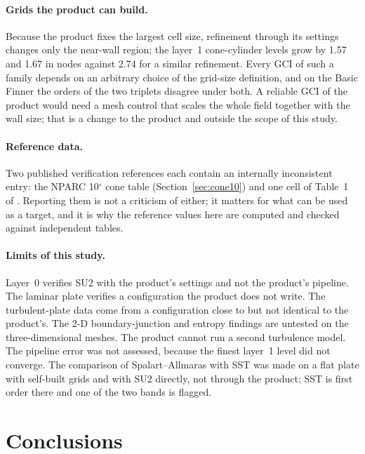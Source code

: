 \documentclass[11pt,a4paper]{article}
\begin{document}
\paragraph{Grids the product can build.}
Because the product fixes the largest cell size, refinement through its settings changes only the near-wall region; the
layer~1 cone-cylinder levels grow by 1.57 and 1.67 in nodes against 2.74 for a similar refinement.
Every GCI of such a family depends on an arbitrary choice of the grid-size definition, and on the Basic Finner the
orders of the two triplets disagree under both.
A reliable GCI of the product would need a mesh control that scales the whole field together with the wall size;
that is a change to the product and outside the scope of this study.

\paragraph{Reference data.}
Two published verification references each contain an internally inconsistent entry: the NPARC 10$^\circ$ cone table
(Section~\ref{sec:cone10}) and one cell of Table~1 of \citet{celik2008}.
Reporting them is not a criticism of either; it matters for what can be used as a target, and it is why the
reference values here are computed and checked against independent tables.

\paragraph{Limits of this study.}
Layer~0 verifies SU2 with the product's settings and not the product's pipeline.
The laminar plate verifies a configuration the product does not write.
The turbulent-plate data come from a configuration close to but not identical to the product's.
The 2-D boundary-junction and entropy findings are untested on the three-dimensional meshes.
The product cannot run a second turbulence model.
The pipeline error was not assessed, because the finest layer~1 level did not converge.
The comparison of Spalart--Allmaras with SST was made on a flat plate with self-built grids and with SU2 directly, not through the product; SST is first order there and one of the two bands is flagged.

\section{Conclusions}
\label{sec:conclusions}
\end{document}
